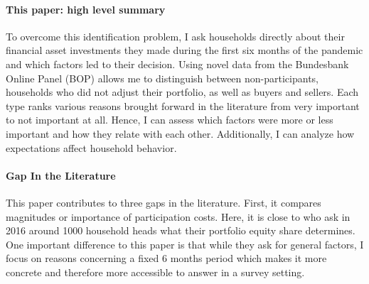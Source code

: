 \documentclass[ProjectABM]{subfiles}
\begin{document}
\paragraph{This paper: high level summary}
 To overcome this identification problem, I ask households directly about their financial asset investments they made during the first six months of the pandemic and which factors led to their decision. 
 Using novel data from the Bundesbank Online Panel (BOP) allows me to distinguish between non-participants, households who did not adjust their portfolio, as well as buyers and sellers. Each type ranks various reasons brought forward in the literature from very important to not important at all. Hence, I can assess which factors were more or less important and how they relate with each other. 
 Additionally, I can analyze how expectations affect household behavior.



\paragraph{Gap In the Literature}
This paper contributes to three gaps in the literature. First, it compares magnitudes or importance of participation costs. Here, it is close to \cite{choi_2020} who ask in 2016 around 1000 household heads what their portfolio equity share determines. One important difference to this paper is that while they ask for general factors, I focus on reasons concerning a fixed 6 months period which makes it more concrete and therefore more accessible to answer in a survey setting. %
\end{document}
